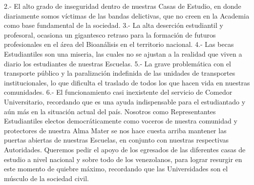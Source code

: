 \documentclass{article}%
\begin{document}
\newline%
%
2.{-} El alto grado de inseguridad dentro de nuestras Casas de Estudio, en donde diariamente somos víctimas de las bandas delictivas, que no creen en la Academia como base fundamental de la sociedad.%
\newline%
%
3.{-} La alta deserción estudiantil y profesoral, ocasiona un gigantesco retraso para la formación de futuros profesionales en el área del Bioanálisis en el territorio nacional.%
\newline%
%
4.{-} Las becas Estudiantiles son una miseria, las cuales no se ajustan a la realidad que viven a diario los estudiantes de nuestras Escuelas.%
\newline%
%
5.{-} La grave problemática con el transporte público y la paralización indefinida de las unidades de transportes institucionales, lo que dificulta el traslado de todos los que hacen vida en nuestras comunidades.%
\newline%
%
6.{-} El funcionamiento casi inexistente del servicio de Comedor Universitario, recordando que es una ayuda indispensable para el estudiantado y aún más en la situación actual del país.%
\newline%
%
Nosotros como Representantes Estudiantiles electos democráticamente como voceros de nuestra comunidad y protectores de nuestra Alma Mater se nos hace cuesta arriba mantener las puertas abiertas de nuestras Escuelas, en conjunto con nuestras respectivas Autoridades.%
\newline%
%
Queremos pedir el apoyo de los egresados de las diferentes casas de estudio a nivel nacional y sobre todo de los venezolanos, para lograr resurgir en este momento de quiebre máximo, recordando que las Universidades son el músculo de la sociedad civil.%
\newline%
%
\end{document}
